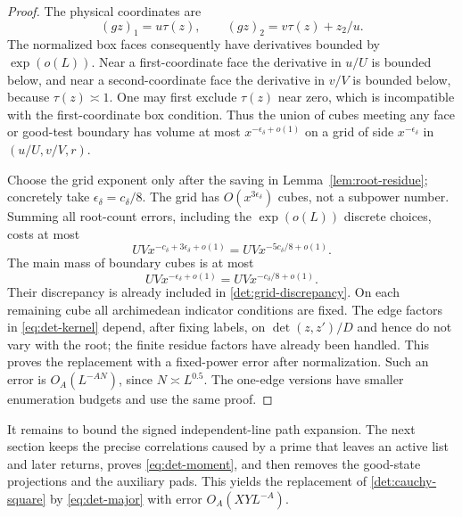 \begin{proof}
The physical coordinates are
\begin{equation}\label{det:transported-position}
 (gz)_1=u\tau(z),\qquad
 (gz)_2=v\tau(z)+z_2/u.
\end{equation}
The normalized box faces consequently have derivatives bounded
by $\exp(o(L))$.  Near a first-coordinate face the derivative
in $u/U$ is bounded below, and near a second-coordinate face
the derivative in $v/V$ is bounded below, because
$\tau(z)\asymp1$.  One may first exclude $\tau(z)$ near zero,
which is incompatible with the first-coordinate box condition.
Thus the union of cubes meeting any face or good-test boundary
has volume at most $x^{-\epsilon_\delta+o(1)}$ on a grid of
side $x^{-\epsilon_\delta}$ in $(u/U,v/V,r)$.

Choose the grid exponent only after the saving in
Lemma~\ref{lem:root-residue}; concretely take
$\epsilon_\delta=c_\delta/8$.  The grid has
$O(x^{3\epsilon_\delta})$ cubes, not a subpower number.
Summing all root-count errors, including the
$\exp(o(L))$ discrete choices, costs at most
\begin{equation}\label{det:grid-discrepancy}
 UVx^{-c_\delta+3\epsilon_\delta+o(1)}
       =UVx^{-5c_\delta/8+o(1)}.
\end{equation}
The main mass of boundary cubes is at most
\begin{equation}\label{det:grid-boundary}
 UVx^{-\epsilon_\delta+o(1)}
       =UVx^{-c_\delta/8+o(1)}.
\end{equation}
Their discrepancy is already included in
\eqref{det:grid-discrepancy}.  On each remaining cube all
archimedean indicator conditions are fixed.  The edge factors
in \eqref{eq:det-kernel} depend, after fixing labels, on
$\det(z,z')/D$ and hence do not vary with the root; the
finite residue factors have already been handled.
This proves the replacement with a fixed-power error after
normalization.  Such an error is $O_A(L^{-AN})$, since
$N\asymp L^{0.5}$.  The one-edge versions have smaller
enumeration budgets and use the same proof.
\end{proof}

It remains to bound the signed independent-line path expansion.
The next section keeps the precise correlations caused by a
prime that leaves an active list and later returns, proves
\eqref{eq:det-moment}, and then removes the good-state
projections and the auxiliary pads.  This yields the
replacement of \eqref{det:cauchy-square} by
\eqref{eq:det-major} with error $O_A(XYL^{-A})$.
